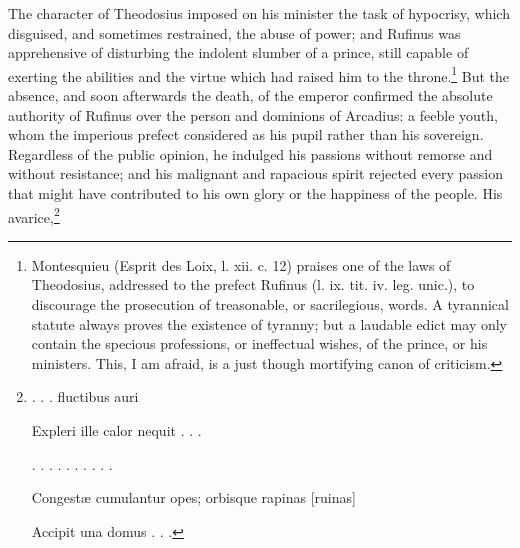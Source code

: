 The character of Theodosius imposed on his minister the task of hypocrisy, which disguised, and sometimes restrained, the abuse of power; and Rufinus was apprehensive of disturbing the indolent slumber of a prince, still capable of exerting the abilities and the virtue which had raised him to the throne.\footnote{Montesquieu (Esprit des Loix, l. xii. c. 12) praises one of the laws of Theodosius, addressed to the prefect Rufinus (l. ix. tit. iv. leg. unic.), to discourage the prosecution of treasonable, or sacrilegious, words. A tyrannical statute always proves the existence of tyranny; but a laudable edict may only contain the specious professions, or ineffectual wishes, of the prince, or his ministers. This, I am afraid, is a just though mortifying canon of criticism.} But the absence, and soon afterwards the death, of the emperor confirmed the absolute authority of Rufinus over the person and dominions of Arcadius: a feeble youth, whom the imperious prefect considered as his pupil rather than his sovereign. Regardless of the public opinion, he indulged his passions without remorse and without resistance; and his malignant and rapacious spirit rejected every passion that might have contributed to his own glory or the happiness of the people. His avarice,\footnote{. . . fluctibus auri

Expleri ille calor nequit . . .

. . . . . . . . . .

Congestæ cumulantur opes; orbisque rapinas [ruinas]

Accipit una domus . . .

}
